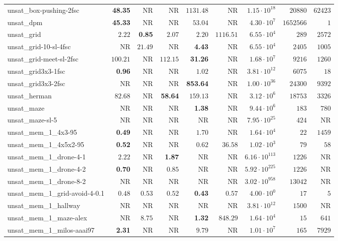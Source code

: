 \begin{tabular}{lrrrrrrrr}
unsat\_box-pushing-2fsc & \textbf{48.35} & NR & NR & $1131.48$ & NR & $1.15\cdot 10^{18}$ & $20880$ & $62423$ \\
unsat\_dpm & \textbf{45.33} & NR & NR & $53.04$ & NR & $4.30\cdot 10^{7}$ & $1652566$ & $1$ \\
unsat\_grid & $2.22$ & \textbf{0.85} & $2.07$ & $2.20$ & $1116.51$ & $6.55\cdot 10^{4}$ & $289$ & $2572$ \\
unsat\_grid-10-sl-4fsc & NR & $21.49$ & NR & \textbf{4.43} & NR & $6.55\cdot 10^{4}$ & $2405$ & $1005$ \\
unsat\_grid-meet-sl-2fsc & $100.21$ & NR & $112.15$ & \textbf{31.26} & NR & $1.68\cdot 10^{7}$ & $9216$ & $1260$ \\
unsat\_grid3x3-1fsc & \textbf{0.96} & NR & NR & $1.02$ & NR & $3.81\cdot 10^{12}$ & $6075$ & $18$ \\
unsat\_grid3x3-2fsc & NR & NR & NR & \textbf{853.64} & NR & $1.00\cdot 10^{36}$ & $24300$ & $9392$ \\
unsat\_herman & $82.68$ & NR & \textbf{58.64} & $159.13$ & NR & $3.12\cdot 10^{6}$ & $18753$ & $3326$ \\
unsat\_maze & NR & NR & NR & \textbf{1.38} & NR & $9.44\cdot 10^{6}$ & $183$ & $780$ \\
unsat\_maze-sl-5 & NR & NR & NR & NR & NR & $7.95\cdot 10^{25}$ & $424$ & NR \\
unsat\_mem\_1\_4x3-95 & \textbf{0.49} & NR & NR & $1.70$ & NR & $1.64\cdot 10^{4}$ & $22$ & $1459$ \\
unsat\_mem\_1\_4x5x2-95 & \textbf{0.52} & NR & NR & $0.62$ & $36.58$ & $1.02\cdot 10^{3}$ & $79$ & $58$ \\
unsat\_mem\_1\_drone-4-1 & $2.22$ & NR & \textbf{1.87} & NR & NR & $6.16\cdot 10^{113}$ & $1226$ & NR \\
unsat\_mem\_1\_drone-4-2 & \textbf{0.70} & NR & $0.85$ & NR & NR & $5.92\cdot 10^{225}$ & $1226$ & NR \\
unsat\_mem\_1\_drone-8-2 & NR & NR & NR & NR & NR & $3.02\cdot 10^{958}$ & $13042$ & NR \\
unsat\_mem\_1\_grid-avoid-4-0.1 & $0.48$ & $0.53$ & $0.52$ & \textbf{0.43} & $0.57$ & $4.00\cdot 10^{0}$ & $17$ & $5$ \\
unsat\_mem\_1\_hallway & NR & NR & NR & NR & NR & $3.81\cdot 10^{12}$ & $1500$ & NR \\
unsat\_mem\_1\_maze-alex & NR & $8.75$ & NR & \textbf{1.32} & $848.29$ & $1.64\cdot 10^{4}$ & $15$ & $641$ \\
unsat\_mem\_1\_milos-aaai97 & \textbf{2.31} & NR & NR & $9.79$ & NR & $1.01\cdot 10^{7}$ & $165$ & $7929$ \\

\end{tabular}
